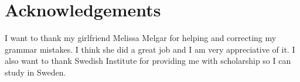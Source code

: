 \section*{Acknowledgements}

I want to thank my girlfriend Melissa Melgar for helping and correcting my grammar mistakes. I think she did a great job and I am very appreciative of it.
I also want to thank Swedish Institute for providing me with scholarship so I can study in Sweden.

\newpage
